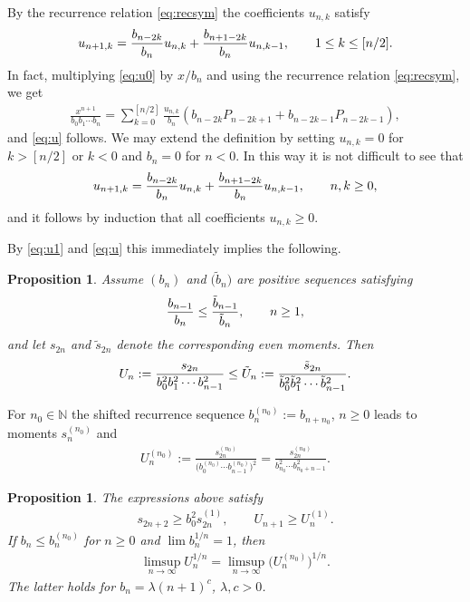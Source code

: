 \documentclass[11pt]{article}
\numberwithin{equation}{section}
\newtheorem{prop}[thm]{Proposition}
\begin{document}
By the recurrence relation \eqref{eq:recsym} the coefficients $u_{n,k}$ satisfy
\begin{gather}\label{eq:u}
u_{n+1,k}={b_{n-2k}\over b_n} u_{n,k}+{b_{n+1-2k}\over b_n}u_{n,k-1},\qquad 1\le k\le [n/2].
\end{gather}
In fact, multiplying \eqref{eq:u0} by $x/b_n$ and using the recurrence relation \eqref{eq:recsym}, we get
\begin{gather*}
\frac{x^{n+1}}{b_0b_1\cdots b_n}=\sum_{k=0}^{[n/2]}\frac{u_{n,k}}{b_n}\left(b_{n-2k}P_{n-2k+1}+b_{n-2k-1}P_{n-2k-1}\right),
\end{gather*}
and \eqref{eq:u} follows. We may extend the definition by setting $u_{n,k}=0$ for $k>[n/2]$ or $k<0$ and $b_n=0$ for $n<0$. In this way it is not difficult to see that
 \begin{gather}\label{eq:u'}
u_{n+1,k}={b_{n-2k}\over b_n} u_{n,k}+{b_{n+1-2k}\over b_n}u_{n,k-1},\qquad n, k\ge 0,
\end{gather}
and it follows by induction that all coefficients $u_{n,k}\ge 0$.

By \eqref{eq:u1} and \eqref{eq:u} this immediately implies the following.

\begin{prop}\label{thm:comparison} Assume $(b_n)$ and $\big(\tilde{b}_n\big)$ are positive sequences satisfying
\begin{gather*}
{b_{n-1}\over b_{n}} \le {\tilde{b}_{n-1}\over \tilde{b}_{n}} ,\qquad n\ge 1,
\end{gather*}
 and let $s_{2n}$ and $\tilde{s}_{2n}$ denote the corresponding even moments. Then
\begin{gather*}
 U_n:={s_{2n}\over b_0^2b_1^2\cdots b_{n-1}^2} \le \tilde{U}_n:={\tilde{s}_{2n}\over \tilde{b}_0^2\tilde{b}_1^2\cdots \tilde{b}_{n-1}^2}.
\end{gather*}
\end{prop}

For $n_0\in\mathbb N$ the shifted recurrence sequence $b_n^{(n_0)}:=b_{n+n_0}$, $n\ge 0$ leads to moments $s_n^{(n_0)}$ and
\begin{gather*}
U_n^{(n_0)}:=\frac{s_{2n}^{(n_0)}}{\big(b_0^{(n_0)}\cdots b_{n-1}^{(n_0)}\big)^2}=\frac{s_{2n}^{(n_0)}}{b_{n_0}^2\cdots b_{n_0+n-1}^2}.
\end{gather*}

\begin{prop}\label{thm:shiftU} The expressions above satisfy
\begin{gather}\label{eq:shiftU1}
s_{2n+2}\ge b_0^2 s_{2n}^{(1)},\qquad U_{n+1}\ge U_n^{(1)}.
\end{gather}
If $b_n\le b_n^{(n_0)}$ for $n\ge 0$ and $\lim b_n^{1/n}=1$, then
\begin{gather}\label{eq:shiftU2}
\limsup_{n\to\infty} U_n^{1/n}=\limsup_{n\to\infty}\big(U_n^{(n_0)}\big)^{1/n}.
\end{gather}
The latter holds for $b_n=\lambda (n+1)^c$, $\lambda, c>0$.
\end{prop}
\end{document}
